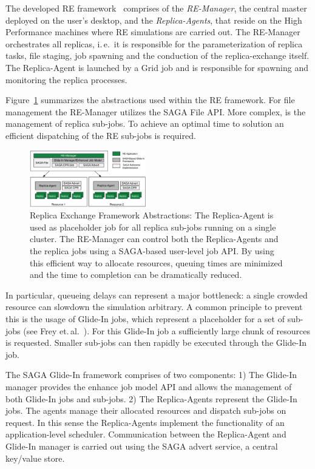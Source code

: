 \documentclass[conference,final]{IEEEtran}
\begin{document}
The developed RE framework~\cite{Luckow:2008la} comprises of the
\emph{RE-Manager}, the central master deployed on the user's desktop,
and the \textit{Replica-Agents}, that reside on the High Performance
machines where RE simulations are carried out. The RE-Manager
orchestrates all replicas, i.\,e.\ it is responsible for the
parameterization of replica tasks, file staging, job spawning and the
conduction of the replica-exchange itself.  The Replica-Agent is
launched by a Grid job and is responsible for spawning and monitoring
the replica processes.

Figure~\ref{fig:remdmanager_v11} summarizes the abstractions used
within the RE framework.  For file management the RE-Manager utilizes
the SAGA File API. More complex, is the management of replica
sub-jobs. To achieve an optimal time to solution an efficient
dispatching of the RE sub-jobs is required.

\begin{figure}[htbp]
    \centering
        \includegraphics[width=0.45\textwidth]{remdmanager_v11.pdf}
    \caption{Replica Exchange Framework Abstractions:      
          The Replica-Agent is used as placeholder job for
          all replica sub-jobs running on a single cluster. The
          RE-Manager can control both the Replica-Agents and the replica
          jobs using a SAGA-based user-level job API. By using this
          efficient way to allocate resources, queuing times are minimized
          and the time to completion can be dramatically reduced.}
    \label{fig:remdmanager_v11}
\end{figure}  

In particular, queueing delays can represent a major bottleneck: a single crowded 
resource can slowdown the simulation arbitrary. A common principle 
to prevent this is the usage of Glide-In jobs, which represent a placeholder 
for a set of sub-jobs (see Frey et.\,al.~\cite{citeulike:291860}). 
For this Glide-In job a sufficiently large chunk of resources 
is requested. Smaller sub-jobs can then rapidly be executed through 
the Glide-In job.

The SAGA Glide-In framework comprises of two components: 1) The Glide-In manager provides 
the enhance job model API and allows the management of both Glide-In jobs and sub-jobs. 
2) The Replica-Agents represent the Glide-In jobs. The agents manage their allocated resources and 
dispatch sub-jobs on request. In this sense the Replica-Agents implement the functionality of 
an application-level scheduler. Communication between the Replica-Agent and Glide-In manager 
is carried out using the SAGA advert service, a central key/value store.
\end{document}
